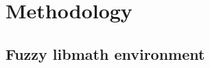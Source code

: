 \documentclass[runningheads]{llncs}
\begin{document}
\section{Methodology}

\subsection{Fuzzy libmath environment}




\end{document}
